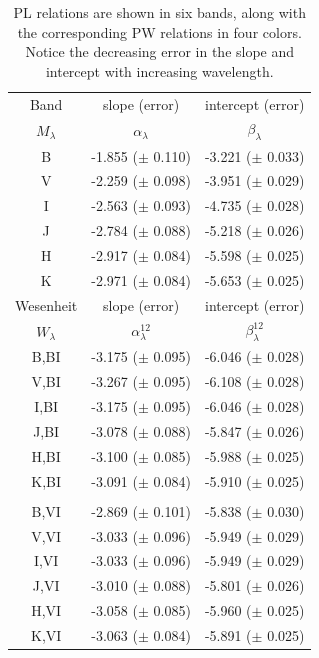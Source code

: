 \begin{table} 
  \vspace{-1cm}
  \centering
 \caption{\tiny PL relations are shown in six bands, along with the corresponding PW relations in four colors. Notice the decreasing error in the slope and intercept with increasing wavelength.}\label{PLWtable}
  {\tiny
	\begin{tabular}{c c c}
	\hline
	Band & slope (error) & intercept (error) \\
	$M_\lambda$ & $\alpha_\lambda$ & $\beta_\lambda$ \\
	\hline        
	B &  -1.855 ($\pm$ 0.110) & -3.221 ($\pm$ 0.033) \\
	V &  -2.259 ($\pm$ 0.098) & -3.951 ($\pm$ 0.029) \\
	I &  -2.563 ($\pm$ 0.093) & -4.735 ($\pm$ 0.028) \\
	J &  -2.784 ($\pm$ 0.088) & -5.218 ($\pm$ 0.026) \\
	H &  -2.917 ($\pm$ 0.084) & -5.598 ($\pm$ 0.025) \\
	K &  -2.971 ($\pm$ 0.084) & -5.653 ($\pm$ 0.025) \\
	\hline
	Wesenheit & slope (error) & intercept (error) \\
	$W_\lambda$ & $\alpha^{12}_\lambda$ & $\beta^{12}_\lambda$ \\
	\hline        
	B,BI &  -3.175 ($\pm$ 0.095) & -6.046 ($\pm$ 0.028) \\
	V,BI &  -3.267 ($\pm$ 0.095) & -6.108 ($\pm$ 0.028) \\
	I,BI &  -3.175 ($\pm$ 0.095) & -6.046 ($\pm$ 0.028) \\
	J,BI &  -3.078 ($\pm$ 0.088) & -5.847 ($\pm$ 0.026) \\
	H,BI &  -3.100 ($\pm$ 0.085) & -5.988 ($\pm$ 0.025) \\
	K,BI &  -3.091 ($\pm$ 0.084) & -5.910 ($\pm$ 0.025) \\
	\\
	B,VI &  -2.869 ($\pm$ 0.101) & -5.838 ($\pm$ 0.030) \\
	V,VI &  -3.033 ($\pm$ 0.096) & -5.949 ($\pm$ 0.029) \\
	I,VI &  -3.033 ($\pm$ 0.096) & -5.949 ($\pm$ 0.029) \\
	J,VI &  -3.010 ($\pm$ 0.088) & -5.801 ($\pm$ 0.026) \\
	H,VI &  -3.058 ($\pm$ 0.085) & -5.960 ($\pm$ 0.025) \\
	K,VI &  -3.063 ($\pm$ 0.084) & -5.891 ($\pm$ 0.025) \\

\end{tabular}}
\end{table}
